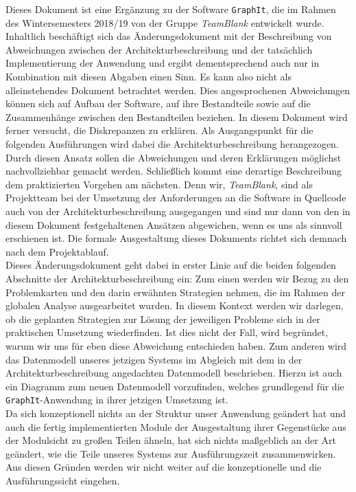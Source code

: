 \documentclass[enabledeprecatedfontcommands,fontsize=11pt,paper=a4,twoside]{scrartcl}
\newcounter{one}
\begin{document}
Dieses Dokument ist eine Ergänzung zu der Software \texttt{GraphIt}, die im Rahmen des Wintersemesters 2018/19 von der Gruppe \textit{TeamBlank} entwickelt wurde. Inhaltlich beschäftigt sich das Änderungsdokument mit der Beschreibung von Abweichungen zwischen der Architekturbeschreibung und der tatsächlich Implementierung der Anwendung und ergibt dementsprechend auch nur in Kombination mit diesen Abgaben einen Sinn. Es kann also nicht als alleinstehendes Dokument betrachtet werden.  Dies angesprochenen Abweichungen können sich auf Aufbau der Software, auf ihre Bestandteile sowie auf die Zusammenhänge zwischen den Bestandteilen beziehen. In diesem Dokument wird ferner versucht, die Diskrepanzen zu erklären. Als Ausgangspunkt für die folgenden Ausführungen wird dabei die Architekturbeschreibung herangezogen. Durch diesen Ansatz sollen die Abweichungen und deren Erklärungen möglichst nachvollziehbar gemacht werden. Schließlich kommt eine derartige Beschreibung dem praktizierten Vorgehen am nächsten. Denn wir, \textit{TeamBlank}, sind als Projektteam bei der Umsetzung der Anforderungen an die Software in Quellcode auch von der Architekturbeschreibung ausgegangen und sind nur dann von den in diesem Dokument festgehaltenen Ansätzen abgewichen, wenn es uns als sinnvoll  erschienen ist. Die formale Ausgestaltung dieses Dokuments richtet sich demnach nach dem Projektablauf. \\ 
Dieses Änderungsdokument geht dabei in erster Linie auf die beiden folgenden Abschnitte der Architekturbeschreibung ein: Zum einen werden wir Bezug zu den Problemkarten und den darin erwähnten Strategien nehmen, die im Rahmen der globalen Analyse ausgearbeitet wurden. In diesem Kontext werden wir darlegen, ob die geplanten Strategien zur Lösung der jeweiligen Probleme sich in der praktischen Umsetzung wiederfinden. Ist dies nicht der Fall, wird begründet, warum wir uns für eben diese Abweichung entschieden haben. Zum anderen wird das Datenmodell unseres jetzigen Systems im Abgleich mit dem in der Architekturbeschreibung angedachten Datenmodell beschrieben. Hierzu ist auch ein Diagramm zum neuen Datenmodell vorzufinden, welches grundlegend für die \texttt{GraphIt}-Anwendung in ihrer jetzigen Umsetzung ist. \\
Da sich konzeptionell nichts an der Struktur unser Anwendung geändert hat und auch die fertig implementierten Module der Ausgestaltung ihrer Gegenstücke aus der Modulsicht zu großen Teilen ähneln, hat sich nichts maßgeblich an der Art geändert, wie die Teile unseres Systems zur Ausführungszeit zusammenwirken. Aus diesen Gründen werden wir nicht weiter auf die konzeptionelle und die Ausführungssicht eingehen. \\
\newpage
\end{document}
